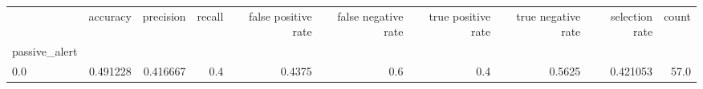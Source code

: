 \begin{tabular}{lrrrrrrrrr}
\toprule
{} &  accuracy &  precision &  recall &  false positive rate &  false negative rate &  true positive rate &  true negative rate &  selection rate &  count \\
passive\_alert &           &            &         &                      &                      &                     &                     &                 &        \\
\midrule
0.0           &  0.491228 &   0.416667 &     0.4 &               0.4375 &                  0.6 &                 0.4 &              0.5625 &        0.421053 &   57.0 \\
\bottomrule
\end{tabular}
